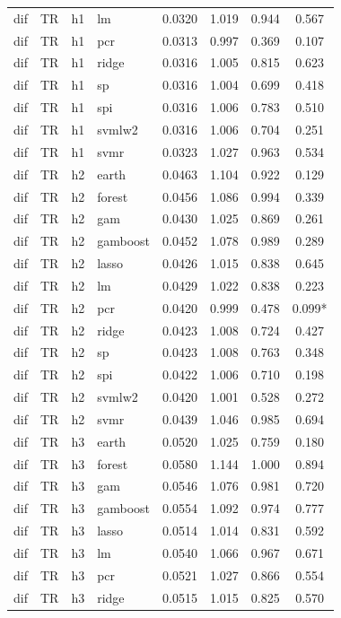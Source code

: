 \begin{ThreePartTable}
\begin{longtable}[t]{llclcccc}
dif & TR & h1 & lm & 0.0320 & 1.019 & 0.944 & 0.567\\
dif & TR & h1 & pcr & 0.0313 & 0.997 & 0.369 & 0.107\\
dif & TR & h1 & ridge & 0.0316 & 1.005 & 0.815 & 0.623\\
dif & TR & h1 & sp & 0.0316 & 1.004 & 0.699 & 0.418\\
dif & TR & h1 & spi & 0.0316 & 1.006 & 0.783 & 0.510\\
dif & TR & h1 & svmlw2 & 0.0316 & 1.006 & 0.704 & 0.251\\
dif & TR & h1 & svmr & 0.0323 & 1.027 & 0.963 & 0.534\\
\addlinespace
dif & TR & h2 & earth & 0.0463 & 1.104 & 0.922 & 0.129\\
dif & TR & h2 & forest & 0.0456 & 1.086 & 0.994 & 0.339\\
dif & TR & h2 & gam & 0.0430 & 1.025 & 0.869 & 0.261\\
dif & TR & h2 & gamboost & 0.0452 & 1.078 & 0.989 & 0.289\\
dif & TR & h2 & lasso & 0.0426 & 1.015 & 0.838 & 0.645\\
dif & TR & h2 & lm & 0.0429 & 1.022 & 0.838 & 0.223\\
dif & TR & h2 & pcr & 0.0420 & 0.999 & 0.478 & 0.099*\\
dif & TR & h2 & ridge & 0.0423 & 1.008 & 0.724 & 0.427\\
dif & TR & h2 & sp & 0.0423 & 1.008 & 0.763 & 0.348\\
dif & TR & h2 & spi & 0.0422 & 1.006 & 0.710 & 0.198\\
dif & TR & h2 & svmlw2 & 0.0420 & 1.001 & 0.528 & 0.272\\
dif & TR & h2 & svmr & 0.0439 & 1.046 & 0.985 & 0.694\\
\addlinespace
dif & TR & h3 & earth & 0.0520 & 1.025 & 0.759 & 0.180\\
dif & TR & h3 & forest & 0.0580 & 1.144 & 1.000 & 0.894\\
dif & TR & h3 & gam & 0.0546 & 1.076 & 0.981 & 0.720\\
dif & TR & h3 & gamboost & 0.0554 & 1.092 & 0.974 & 0.777\\
dif & TR & h3 & lasso & 0.0514 & 1.014 & 0.831 & 0.592\\
dif & TR & h3 & lm & 0.0540 & 1.066 & 0.967 & 0.671\\
dif & TR & h3 & pcr & 0.0521 & 1.027 & 0.866 & 0.554\\
dif & TR & h3 & ridge & 0.0515 & 1.015 & 0.825 & 0.570\\

\end{longtable}
\end{ThreePartTable}
